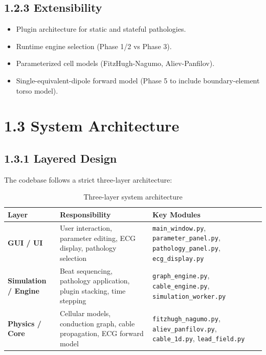 \documentclass[12pt,oneside,a4paper]{book}
\newcommand{\file}[1]{\texttt{#1}}
\begin{document}
\subsection{1.2.3 Extensibility}

\begin{itemize}
  \item Plugin architecture for static and stateful pathologies.
  \item Runtime engine selection (Phase 1/2 vs Phase 3).
  \item Parameterized cell models (FitzHugh-Nagumo, Aliev-Panfilov).
  \item Single-equivalent-dipole forward model (Phase 5 to include boundary-element torso model).
\end{itemize}

\section{1.3 System Architecture}

\subsection{1.3.1 Layered Design}

The codebase follows a strict three-layer architecture:

\begin{table}[H]
\centering
\begin{tabularx}{\textwidth}{|l|X|X|}
\hline
\textbf{Layer} & \textbf{Responsibility} & \textbf{Key Modules} \\
\hline
\textbf{GUI / UI} & User interaction, parameter editing, ECG display, pathology selection &
  \file{main\_window.py}, \file{parameter\_panel.py}, \file{pathology\_panel.py}, \file{ecg\_display.py} \\
\hline
\textbf{Simulation / Engine} & Beat sequencing, pathology application, plugin stacking, time stepping &
  \file{graph\_engine.py}, \file{cable\_engine.py}, \file{simulation\_worker.py} \\
\hline
\textbf{Physics / Core} & Cellular models, conduction graph, cable propagation, ECG forward model &
  \file{fitzhugh\_nagumo.py}, \file{aliev\_panfilov.py}, \file{cable\_1d.py}, \file{lead\_field.py} \\
\hline
\end{tabularx}
\caption{Three-layer system architecture}
\label{tab:architecture_layers}
\end{table}
\end{document}
